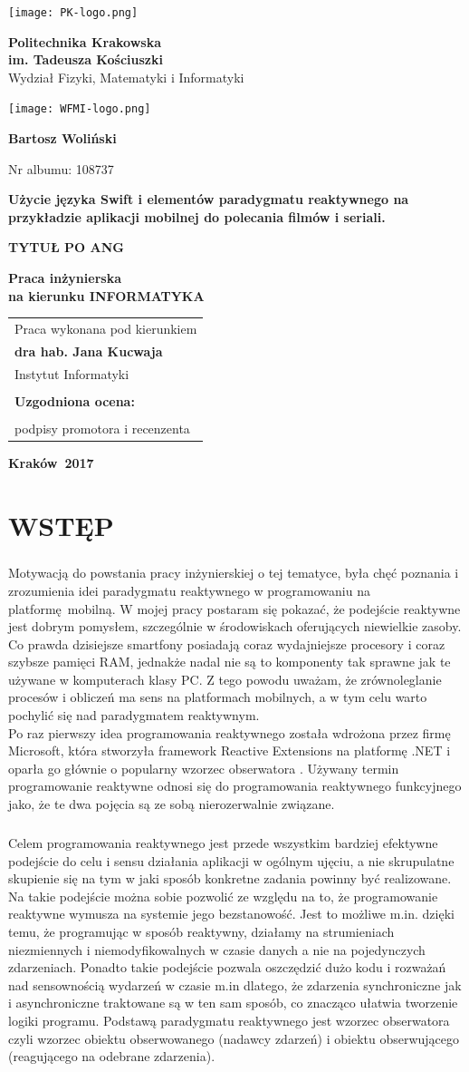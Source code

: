 \documentclass[12pt,oneside,a4paper]{report}
\renewcommand\maketitle{%
	\begin{titlepage}%
		\noindent
		\begin{minipage}[b]{0.9in}%
			\texttt{[image: PK-logo.png]}
		\end{minipage}
		\begin{minipage}[b]{4.5in}%
			\begin{center}%
				{\LARGE\textbf{Politechnika Krakowska \\ im. Tadeusza Ko\'sciuszki}\\
					\vspace{0.2cm}
					Wydzia\l{} Fizyki, Matematyki i Informatyki\par}
			\end{center}
		\end{minipage}
		\begin{minipage}[b]{1in}%
			\texttt{[image: WFMI-logo.png]}
		\end{minipage}
		
		\vspace{1cm plus 1fill} 
		
		\begin{center}%
			\vspace{0.2cm}
			{\Large\bf\autor\par}
			{\large Nr albumu: \nralbumu\par}                                           
			\vspace{8mm plus .1fill}
			{\LARGE\textbf{\tytulpl}\par}
			\vspace{2mm}
			{\LARGE\textbf{\tytulang}\par}
			\vspace{8mm plus .1fill}
			{\large\bf Praca \rodzajpracy\\[3pt]
				na kierunku \MakeUppercase{\kierunek}
			}
			\vspace{2cm plus 1.5fill}
			\begin{flushright}\large
				\begin{tabular}{l}
					Praca wykonana pod kierunkiem\\
					\bfseries \opiekun\\ \\
					\bfseries Uzgodniona ocena:\dotfill \\[10mm]
					\dotfill\\
					podpisy promotora i recenzenta
				\end{tabular}
			\end{flushright}
			\vspace{1cm plus 1fill}
			{\large \textbf{\miasto\ \rok}\par}
		\end{center}
	\end{titlepage}
}
\def\autor{Bartosz Woliński}
\def\nralbumu{108737}
\def\tytulpl{Użycie języka Swift i elementów paradygmatu reaktywnego na przykładzie aplikacji mobilnej do polecania filmów i seriali.}
\def\tytulang{TYTUŁ PO ANG}
\def\rodzajpracy{inżynierska}
\def\kierunek{informatyka}
\def\opiekun{dra hab. Jana Kucwaja\\
	Instytut Informatyki }
\def\miasto{Kraków}
\def\rok{2017}
\begin{document}
\maketitle
\newpage
\tableofcontents
\chapter{WSTĘP}

\paragraph{}Motywacją do powstania pracy inżynierskiej o tej tematyce, była chęć poznania i zrozumienia idei paradygmatu reaktywnego w programowaniu na platformę mobilną. W mojej pracy postaram się pokazać, że podejście reaktywne jest dobrym pomysłem,  szczególnie w środowiskach oferujących niewielkie zasoby. Co prawda dzisiejsze smartfony posiadają coraz wydajniejsze procesory i coraz szybsze pamięci RAM, jednakże nadal nie są to komponenty tak sprawne jak te używane w komputerach klasy PC. Z tego powodu uważam, że zrównoleglanie procesów i obliczeń ma sens na platformach mobilnych, a w tym celu warto pochylić się nad paradygmatem reaktywnym.\\ Po raz pierwszy idea programowania reaktywnego została wdrożona przez firmę Microsoft, która stworzyła framework Reactive Extensions na platformę .NET i oparła go głównie o popularny wzorzec obserwatora \cite{MicrosoftRx}. 
Używany termin programowanie reaktywne odnosi się do programowania reaktywnego funkcyjnego jako, że te dwa pojęcia są ze sobą nierozerwalnie związane.
\paragraph{}Celem programowania reaktywnego jest przede wszystkim bardziej efektywne podejście do celu i sensu działania aplikacji w ogólnym ujęciu, a nie skrupulatne skupienie się na tym w jaki sposób konkretne zadania powinny być realizowane. Na takie podejście można sobie pozwolić ze względu na to, że programowanie reaktywne wymusza na systemie jego bezstanowość. Jest to możliwe m.in. dzięki temu, że programując w sposób reaktywny, działamy na strumieniach niezmiennych i niemodyfikowalnych w czasie danych a nie na pojedynczych zdarzeniach. Ponadto takie podejście pozwala oszczędzić dużo kodu i rozważań nad sensownością wydarzeń w czasie m.in dlatego, że zdarzenia synchroniczne jak i asynchroniczne traktowane są w ten sam sposób, co znacząco ułatwia tworzenie logiki programu. Podstawą paradygmatu reaktywnego jest wzorzec obserwatora czyli wzorzec obiektu obserwowanego (nadawcy zdarzeń) i obiektu obserwującego (reagującego na odebrane zdarzenia).
\end{document}
